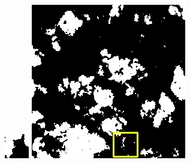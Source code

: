 \documentclass[10pt]{ctexart}
\begin{document}
\begin{figure}[H]
{{\begin{minipage}[b]{0.15\linewidth}
            \includegraphics[width=1\linewidth]{../log/spoon2/cut/tmp_cut_LC80350192014190LGN00_06561_mask.jpg}\vspace{4pt}
            \includegraphics[width=1\linewidth]{../log/spoon2/cut/LC80980712014024LGN00_15443_mask.jpg}\vspace{4pt}

\end{minipage}}}
\end{figure}
\end{document}
